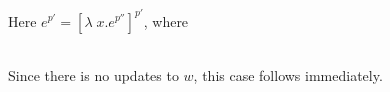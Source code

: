 \item[\runa{Abs}] Here $e^{p'}=[\lambda\;x.e^{p''}]^{p'}$, where
\begin{figure}[H]
	\setlength\tabcolsep{8pt}
	\begin{tabular}{l}
		
	\end{tabular}
\end{figure}
Since there is no updates to $w$, this case follows immediately.

